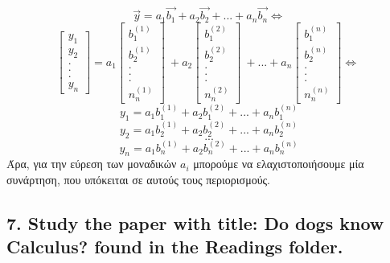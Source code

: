 \documentclass[12pt]{article}
\begin{document}
$$\vec{y} = a_1\vec{b_1} + a_2\vec{b_2} + ... + a_n\vec{b_n} \Leftrightarrow $$
$$ \begin{bmatrix}
	y_{1}\\
	y_{2}\\
	.\\
	.\\
	.\\
	y_{n}
\end{bmatrix} = a_1
\begin{bmatrix}
b_{1}^{(1)}\\
b_{2}^{(1)}\\
.\\
.\\
.\\
n_{n}^{(1)}
\end{bmatrix} \ + a_2
\begin{bmatrix}
b_{1}^{(2)}\\
b_{2}^{(2)}\\
.\\
.\\
.\\
n_{n}^{(2)}
\end{bmatrix} \ +...+a_n
\begin{bmatrix}
b_{1}^{(n)}\\
b_{2}^{(n)}\\
.\\
.\\
.\\
n_{n}^{(n)}
\end{bmatrix} \Leftrightarrow \ $$
$$ y_1 = a_1b_{1}^{(1)} + a_2b_{1}^{(2)} +...+ a_nb_{1}^{(n)} $$
$$ y_2 = a_1b_{2}^{(1)} + a_2b_{2}^{(2)} +...+ a_nb_{2}^{(n)} $$
$$ ... $$
$$ y_n = a_1b_{n}^{(1)} + a_2b_{n}^{(2)} +...+ a_nb_{n}^{(n)} $$
Άρα, για την εύρεση των μοναδικών $a_i$ μπορούμε να ελαχιστοποιήσουμε μία συνάρτηση, που υπόκειται σε αυτούς τους περιορισμούς. \\
\vspace{2in}

\pagebreak

\subsection*{7. Study the paper with title: Do dogs know Calculus? found in the Readings folder.}

\vspace{2in}

\pagebreak
\end{document}
